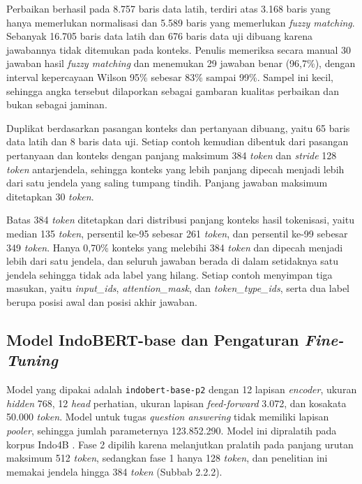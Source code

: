 Perbaikan berhasil pada 8.757 baris data latih, terdiri atas 3.168 baris yang hanya memerlukan normalisasi dan 5.589 baris yang memerlukan \textit{fuzzy matching}. Sebanyak 16.705 baris data latih dan 676 baris data uji dibuang karena jawabannya tidak ditemukan pada konteks. Penulis memeriksa secara manual 30 jawaban hasil \textit{fuzzy matching} dan menemukan 29 jawaban benar (96,7\%), dengan interval kepercayaan Wilson 95\% sebesar 83\% sampai 99\%. Sampel ini kecil, sehingga angka tersebut dilaporkan sebagai gambaran kualitas perbaikan dan bukan sebagai jaminan.

Duplikat berdasarkan pasangan konteks dan pertanyaan dibuang, yaitu 65 baris data latih dan 8 baris data uji. Setiap contoh kemudian dibentuk dari pasangan pertanyaan dan konteks dengan panjang maksimum 384 \textit{token} dan \textit{stride} 128 \textit{token} antarjendela, sehingga konteks yang lebih panjang dipecah menjadi lebih dari satu jendela yang saling tumpang tindih. Panjang jawaban maksimum ditetapkan 30 \textit{token}.

Batas 384 \textit{token} ditetapkan dari distribusi panjang konteks hasil tokenisasi, yaitu median 135 \textit{token}, persentil ke-95 sebesar 261 \textit{token}, dan persentil ke-99 sebesar 349 \textit{token}. Hanya 0,70\% konteks yang melebihi 384 \textit{token} dan dipecah menjadi lebih dari satu jendela, dan seluruh jawaban berada di dalam setidaknya satu jendela sehingga tidak ada label yang hilang. Setiap contoh menyimpan tiga masukan, yaitu \textit{input\_ids}, \textit{attention\_mask}, dan \textit{token\_type\_ids}, serta dua label berupa posisi awal dan posisi akhir jawaban.

\subsection{Model IndoBERT-base dan Pengaturan \textit{Fine-Tuning}}

Model yang dipakai adalah \texttt{indobert-base-p2} dengan 12 lapisan \textit{encoder}, ukuran \textit{hidden} 768, 12 \textit{head} perhatian, ukuran lapisan \textit{feed-forward} 3.072, dan kosakata 50.000 \textit{token}. Model untuk tugas \textit{question answering} tidak memiliki lapisan \textit{pooler}, sehingga jumlah parameternya 123.852.290. Model ini dipralatih pada korpus Indo4B \parencite{wilie2020indonlu}. Fase 2 dipilih karena melanjutkan pralatih pada panjang urutan maksimum 512 \textit{token}, sedangkan fase 1 hanya 128 \textit{token}, dan penelitian ini memakai jendela hingga 384 \textit{token} (Subbab 2.2.2).

